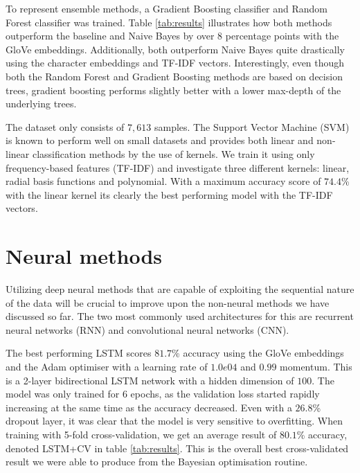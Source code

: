 \documentclass[journal, ]{IEEEtran}
\let\MYoriglatexcaption\caption
\renewcommand{\caption}[2][\relax]{\MYoriglatexcaption[#2]{#2}}
\begin{document}
To represent ensemble methods, a Gradient Boosting classifier and Random Forest classifier was trained. Table \ref{tab:results} illustrates how both methods outperform the baseline and Naive Bayes by over $8$ percentage points with the GloVe embeddings. Additionally, both outperform Naive Bayes quite drastically using the character embeddings and TF-IDF vectors. Interestingly, even though both the Random Forest and Gradient Boosting methods are based on decision trees, gradient boosting performs slightly better with a lower max-depth of the underlying trees.

The dataset only consists of $7,613$ samples. The Support Vector Machine (SVM) is known to perform well on small datasets and provides both linear and non-linear classification methods by the use of kernels. We train it using only frequency-based features (TF-IDF) and investigate three different kernels: linear, radial basis functions and polynomial. With a maximum accuracy score of $74.4$\% with the linear kernel its clearly the best performing model with the TF-IDF vectors. 

\section{Neural methods}
Utilizing deep neural methods that are capable of exploiting the sequential nature of the data will be crucial to improve upon the non-neural methods we have discussed so far. The two most commonly used architectures for this are recurrent neural networks (RNN) and convolutional neural networks (CNN). 

The best performing LSTM scores $81.7$\% accuracy using the GloVe embeddings and the Adam optimiser with a learning rate of $1.0e04$ and $0.99$ momentum. This is a 2-layer bidirectional LSTM network with a hidden dimension of $100$. The model was only trained for $6$ epochs, as the validation loss started rapidly increasing at the same time as the accuracy decreased. Even with a $26.8$\% dropout layer, it was clear that the model is very sensitive to overfitting. 
When training with 5-fold cross-validation, we get an average result of $80.1$\% accuracy, denoted LSTM+CV in table \ref{tab:results}. This is the overall best cross-validated result we were able to produce from the Bayesian optimisation routine. 

\end{document}
